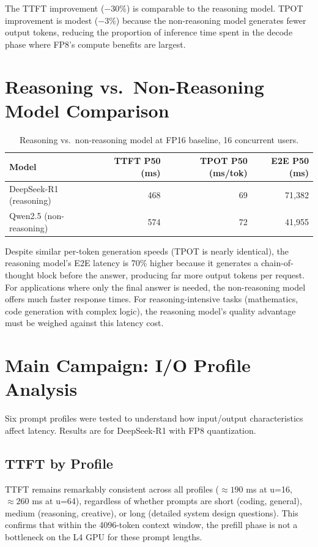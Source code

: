 \documentclass[a4paper,12pt]{report}
\begin{document}
The TTFT improvement ($-30\%$) is comparable to the reasoning model. TPOT improvement is modest ($-3\%$) because the non-reasoning model generates fewer output tokens, reducing the proportion of inference time spent in the decode phase where FP8's compute benefits are largest.

\section{Reasoning vs.\ Non-Reasoning Model Comparison}

\begin{table}[h!]
\caption{Reasoning vs.\ non-reasoning model at FP16 baseline, 16 concurrent users.}
\centering
\begin{tabular}{|l|r|r|r|}
\hline
\textbf{Model} & \textbf{TTFT P50 (ms)} & \textbf{TPOT P50 (ms/tok)} & \textbf{E2E P50 (ms)} \\
\hline
DeepSeek-R1 (reasoning) & 468 & 69 & 71{,}382 \\
Qwen2.5 (non-reasoning) & 574 & 72 & 41{,}955 \\
\hline
\end{tabular}
\label{table:reasoning_vs_nonreasoning}
\end{table}

Despite similar per-token generation speeds (TPOT is nearly identical), the reasoning model's E2E latency is 70\% higher because it generates a chain-of-thought block before the answer, producing far more output tokens per request. For applications where only the final answer is needed, the non-reasoning model offers much faster response times. For reasoning-intensive tasks (mathematics, code generation with complex logic), the reasoning model's quality advantage must be weighed against this latency cost.

\section{Main Campaign: I/O Profile Analysis}

Six prompt profiles were tested to understand how input/output characteristics affect latency. Results are for DeepSeek-R1 with FP8 quantization.

\subsection{TTFT by Profile}

TTFT remains remarkably consistent across all profiles ($\approx 190$ ms at u=16, $\approx 260$ ms at u=64), regardless of whether prompts are short (coding, general), medium (reasoning, creative), or long (detailed system design questions). This confirms that within the 4096-token context window, the prefill phase is not a bottleneck on the L4 GPU for these prompt lengths.
\end{document}
